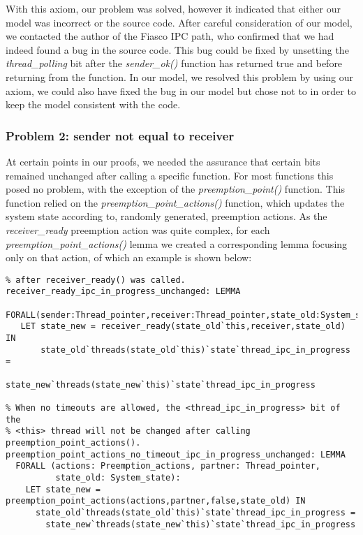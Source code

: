 With this axiom, our problem was solved, however it indicated that either our model was incorrect or the source code. After careful consideration of our model, we contacted the author of the Fiasco IPC path, who confirmed that we had indeed found a bug in the source code. This bug could be fixed by unsetting the \emph{thread\_polling} bit after the \emph{sender\_ok()} function has returned true and before returning from the function. In our model, we resolved this problem by using our axiom, we could also have fixed the bug in our model but chose not to in order to keep the model consistent with the code. 

\subsubsection{Problem 2: sender not equal to receiver}
At certain points in our proofs, we needed the assurance that certain bits remained unchanged after calling a specific function. For most functions this posed no problem, with the exception of the \emph{preemption\_point()} function. This function relied on the \emph{preemption\_point\_actions()} function, which updates the system state according to, randomly generated, preemption actions. As the \emph{receiver\_ready} preemption action was quite complex, for each \emph{preemption\_point\_actions()} lemma we created a corresponding lemma focusing only on that action, of which an example is shown below:

\lstset{language=PVS}
\begin{lstlisting}[caption={PVS: \emph{preemption\_actions()}- and related \emph{receiver\_ready()} lemma.}]
% The <thread_ipc_in_progress> bit of the <this> thread will not be changed 
% after receiver_ready() was called.
receiver_ready_ipc_in_progress_unchanged: LEMMA
 FORALL(sender:Thread_pointer,receiver:Thread_pointer,state_old:System_state):
   LET state_new = receiver_ready(state_old`this,receiver,state_old) IN
       state_old`threads(state_old`this)`state`thread_ipc_in_progress =
         state_new`threads(state_new`this)`state`thread_ipc_in_progress

% When no timeouts are allowed, the <thread_ipc_in_progress> bit of the
% <this> thread will not be changed after calling preemption_point_actions().
preemption_point_actions_no_timeout_ipc_in_progress_unchanged: LEMMA
  FORALL (actions: Preemption_actions, partner: Thread_pointer, 
          state_old: System_state):
    LET state_new = preemption_point_actions(actions,partner,false,state_old) IN
      state_old`threads(state_old`this)`state`thread_ipc_in_progress =
        state_new`threads(state_new`this)`state`thread_ipc_in_progress
\end{lstlisting}

